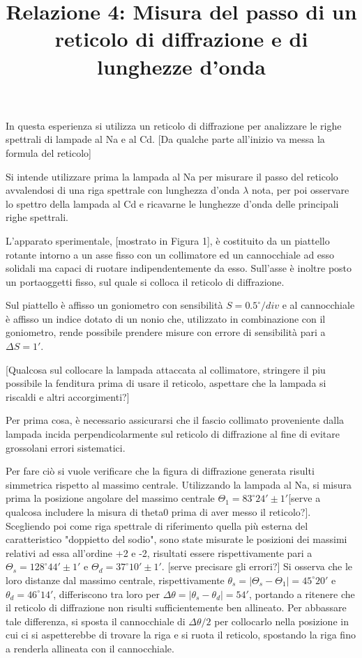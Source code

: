 \documentclass{article}
\title{Relazione 4: Misura del passo di un reticolo di diffrazione
	e di lunghezze d'onda}
\date{}
\begin{document}
	\maketitle
	
	
	In questa esperienza si utilizza un reticolo di diffrazione per analizzare le righe spettrali di lampade al Na e al Cd.  [Da qualche parte all'inizio va messa la formula del reticolo]
	
	Si intende utilizzare prima la lampada al Na per misurare il passo del reticolo avvalendosi di una riga spettrale con lunghezza d'onda $\lambda$ nota, per poi osservare lo spettro della lampada al Cd e ricavarne le lunghezze d'onda delle principali righe spettrali.
	
	L'apparato sperimentale, [mostrato in Figura 1], è costituito da un piattello rotante intorno a un asse fisso con un collimatore ed un cannocchiale ad esso solidali ma capaci di ruotare indipendentemente da esso. Sull'asse è inoltre posto un portaoggetti fisso, sul quale si colloca il reticolo di diffrazione.
	
	Sul piattello è affisso un goniometro con sensibilità $S=0.5^{\circ} / div$ e al cannocchiale è affisso un indice dotato di un nonio che, utilizzato in combinazione con il goniometro, rende possibile prendere misure con errore di sensibilità pari a $\Delta S = 1'$.
	
	[Qualcosa sul collocare la lampada attaccata al collimatore, stringere il piu possibile la fenditura prima di usare il reticolo, aspettare che la lampada si riscaldi e altri accorgimenti?]

	Per prima cosa, è necessario assicurarsi che il fascio collimato proveniente dalla lampada incida perpendicolarmente sul reticolo di diffrazione al fine di evitare grossolani errori sistematici. 
	
	
	Per fare ciò si vuole verificare che la figura di diffrazione generata risulti simmetrica rispetto al massimo centrale.
	Utilizzando la lampada al Na, si misura prima la posizione angolare del massimo centrale $\Theta_1 = 83^\circ 24' \pm 1'$[serve a qualcosa includere la misura di theta0 prima di aver messo il reticolo?].
	Scegliendo poi come riga spettrale di riferimento quella più esterna del caratteristico "doppietto del sodio", sono state misurate le posizioni dei massimi relativi ad essa all'ordine +2 e -2, risultati essere rispettivamente pari a $\Theta_s = 128^\circ 44' \pm 1'$ e $\Theta_d = 37^\circ 10' \pm 1'$. [serve precisare gli errori?]
	Si osserva che le loro distanze dal massimo centrale, rispettivamente $\theta_s = |\Theta_s - \Theta_1| = 45^\circ20'$ e $\theta_d = 46^\circ 14'$, differiscono tra loro per $\Delta\theta = |\theta_s - \theta_d| = 54'$, portando a ritenere che il reticolo di diffrazione non risulti sufficientemente ben allineato.
	Per abbassare tale differenza, si sposta il cannocchiale di $\Delta\theta/2$ per collocarlo nella posizione in cui ci si aspetterebbe di trovare la riga e si ruota il reticolo, spostando la riga fino a renderla allineata con il cannocchiale.
	
\end{document}

